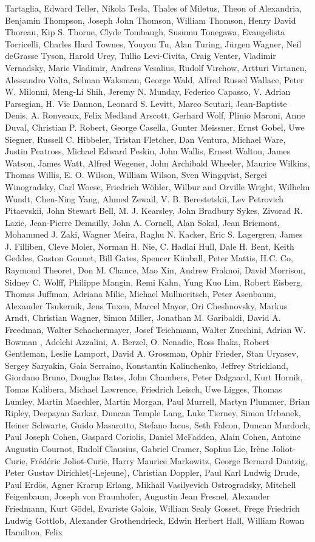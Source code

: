 \begin{spacing}{0.5}
\begin{tiny}
Tartaglia, Edward Teller, Nikola Tesla, Thales of Miletus, Theon of Alexandria, Benjamin Thompson, Joseph John Thomson, William Thomson, Henry David Thoreau, Kip S. Thorne, Clyde Tombaugh, Susumu Tonegawa, Evangelista Torricelli, Charles Hard Townes, Youyou Tu, Alan Turing, Jürgen Wagner, Neil deGrasse Tyson, Harold Urey, Tullio Levi-Civita, Craig Venter, Vladimir Vernadsky, Maric Vladimir, Andreas Vesalius, Rudolf Virchow, Artturi Virtanen, Alessandro Volta, Selman Waksman, George Wald, Alfred Russel Wallace, Peter W. Milonni, Meng-Li Shih, Jeremy N. Munday, Federico Capasso, V. Adrian Parsegian, H. Vic Dannon, Leonard S. Levitt, Marco Scutari, Jean-Baptiste Denis, A. Ronveaux, Felix Medland Arscott, Gerhard Wolf, Plinio Maroni, Anne Duval, Christian P. Robert, George Casella, Gunter Meissner, Ernst Gobel, Uwe Siegner, Russell C. Hibbeler, Tristan Fletcher, Dan Ventura, Michael Ware, Justin Peatross, Michael Edward Peskin, John Wallis, Ernest Walton, James Watson, James Watt, Alfred Wegener, John Archibald Wheeler, Maurice Wilkins, Thomas Willis, E. O. Wilson, William Wilson, Sven Wingqvist, Sergei Winogradsky, Carl Woese, Friedrich Wöhler, Wilbur and Orville Wright, Wilhelm Wundt, Chen-Ning Yang, Ahmed Zewail, V. B. Berestetskii, Lev Petrovich Pitaevskii, John Stewart Bell, M. J. Kearsley, John Bradbury Sykes, Zivorad R. Lazic, Jean-Pierre Demailly, John A. Cornell, Alan Sokal, Jean Bricmont, Mohammed J. Zaki, Wagner Meira, Raghu N. Kacker, Eric S. Lagergren, James J. Filliben, Cleve Moler, Norman H. Nie, C. Hadlai Hull, Dale H. Bent, Keith Geddes, Gaston Gonnet, Bill Gates, Spencer Kimball, Peter Mattis, H.C. Co, Raymond Theoret, Don M. Chance, Mao Xin, Andrew Fraknoi, David Morrison, Sidney C. Wolff, Philippe Mangin, Remi Kahn, Yung Kuo Lim, Robert Eisberg, Thomas Juffman, Adriana Milic, Michael Mullneritsch, Peter Asenbaum, Alexander Tsukernik, Jens Tuxen, Marcel Mayor, Ori Cheshnovsky, Markus Arndt, Christian Wagner, Simon Miller, Jonathan M. Garibaldi, David A. Freedman, Walter Schachermayer, Josef Teichmann, Walter Zucchini, Adrian W. Bowman , Adelchi Azzalini, A. Berzel, O. Nenadic, Ross Ihaka, Robert Gentleman, Leslie Lamport, David A. Grossman, Ophir Frieder, Stan Uryasev, Sergey Saryakin, Gaia Serraino, Konstantin Kalinchenko, Jeffrey Strickland, Giordano Bruno, Douglas Bates, John Chambers, Peter Dalgaard, Kurt Hornik, Tomas Kalibera, Michael Lawrence, Friedrich Leisch, Uwe Ligges, Thomas Lumley, Martin Maechler, Martin Morgan, Paul Murrell, Martyn Plummer, Brian Ripley, Deepayan Sarkar, Duncan Temple Lang, Luke Tierney, Simon Urbanek, Heiner Schwarte, Guido Masarotto, Stefano Iacus, Seth Falcon, Duncan Murdoch, Paul Joseph Cohen, Gaspard Coriolis, Daniel McFadden, Alain Cohen, Antoine Augustin Cournot, Rudolf Clausius, Gabriel Cramer, Sophus Lie, Irène Joliot-Curie, Frédéric Joliot-Curie, Harry Maurice Markowitz, George Bernard Dantzig, Peter Gustav Dirichlet(-Lejeune), Christian Doppler, Paul Karl Ludwig Drude, Paul Erdös, Agner Krarup Erlang, Mikhail Vasilyevich Ostrogradsky, Mitchell Feigenbaum, Joseph von Fraunhofer, Augustin Jean Fresnel, Alexander Friedmann, Kurt Gödel, Evariste Galois, William Sealy Gosset, Frege Friedrich Ludwig Gottlob, Alexander Grothendrieck, Edwin Herbert Hall, William Rowan Hamilton, Felix 
\end{tiny}
\end{spacing}

